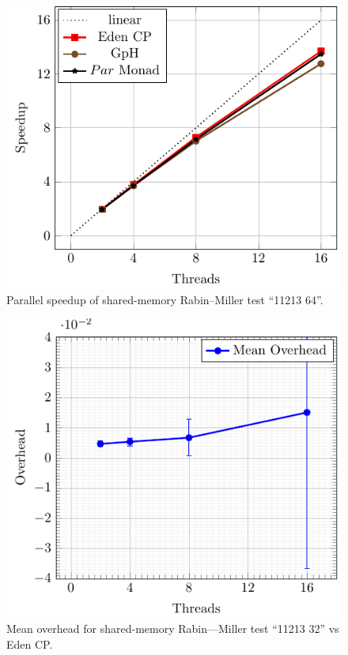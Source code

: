 \documentclass[paper=A4,twoside=true,openright,parskip=full,chapterprefix=true,headings=normal,bibliography=totoc,listof=totoc,titlepage=on,captions=tableabove,draft=false,british]{scrreprt}%
\renewcommand{\enquote}[1]{{``}#1{''}}
\begin{document}
\vfill

\begin{figure}[h]
\centering
\includegraphics{src/img/perfSMRM64.pdf}
\caption{Parallel speedup of shared-memory Rabin--Miller test
\enquote{11213 64}.\label{fig:perfSMRM64}}
\end{figure}

\begin{figure}[h]
\centering
\includegraphics{src/img/overSMRM32Eden.pdf}
\caption{Mean overhead for shared-memory Rabin---Miller test
\enquote{11213 32} vs Eden CP.\label{fig:overSMRM32Eden}}
\end{figure}
\end{document}
